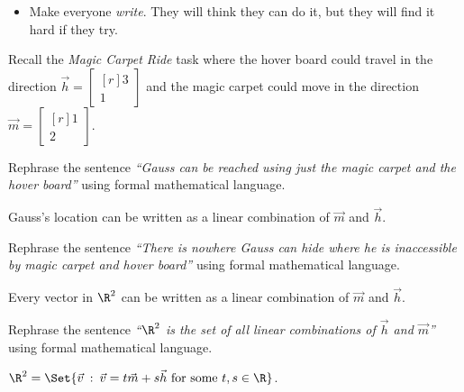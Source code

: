 \documentclass{problemset}
\newcommand{\mat}[1]{\begin{bmatrix*}[r]#1\end{bmatrix*}}
\providecommand\given{}
\newcommand\SetSymbol[1][]{%
	\nonscript\::%
	\allowbreak
	\nonscript\:
	\mathopen{}}
\renewcommand\given{\SetSymbol[\delimsize]}
\begin{document}
	\question
	\begin{annotation}
		\begin{goals}
		\end{goals}

		\begin{notes}
			\begin{itemize}
				\item Make everyone \emph{write}. They will think
					they can do it, but they will find it hard if
					they try.
			\end{itemize}
		\end{notes}
	\end{annotation}
	Recall the \emph{Magic Carpet Ride} task where the hover board could
	travel in the direction $\vec h=\mat{3\\1}$ and the magic carpet could
	move in the direction $\vec m=\mat{1\\2}$.
	\begin{parts}
		\item Rephrase the sentence \emph{``Gauss can be reached using just the
			magic carpet and the hover board''} using formal mathematical
			language.
			\begin{solution}
				Gauss's location can be written as a linear combination of
				$\vec m$ and $\vec h$.
			\end{solution}
		\item Rephrase the sentence \emph{``There is nowhere Gauss can hide
			where he is inaccessible by magic carpet and hover board''} using
			formal mathematical language.
			\begin{solution}
				Every vector in $\R^2$ can be written as a linear combination
				of $\vec m$ and	$\vec h$.
			\end{solution}
		\item Rephrase the sentence \emph{``$\R^2$ is the set of all linear
			combinations of $\vec h$ and $\vec m$''} using formal mathematical
			language.
			\begin{solution}
				$\R^2=\Set{\vec v\given \vec v=t\vec m+s\vec h\text{ for some }t,s\in \R}$.
			\end{solution}
	\end{parts}
\end{document}
